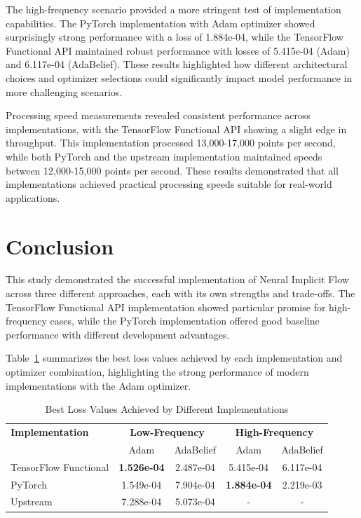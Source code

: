 \documentclass[10pt,journal,compsoc,onecolumn]{IEEEtran}
\begin{document}
The high-frequency scenario provided a more stringent test of implementation capabilities. The PyTorch implementation with Adam optimizer showed surprisingly strong performance with a loss of 1.884e-04, while the TensorFlow Functional API maintained robust performance with losses of 5.415e-04 (Adam) and 6.117e-04 (AdaBelief). These results highlighted how different architectural choices and optimizer selections could significantly impact model performance in more challenging scenarios.

Processing speed measurements revealed consistent performance across implementations, with the TensorFlow Functional API showing a slight edge in throughput. This implementation processed 13,000-17,000 points per second, while both PyTorch and the upstream implementation maintained speeds between 12,000-15,000 points per second. These results demonstrated that all implementations achieved practical processing speeds suitable for real-world applications.

\section{Conclusion}\label{sec:conclusion}
This study demonstrated the successful implementation of Neural Implicit Flow across three different approaches, each with its own strengths and trade-offs. The TensorFlow Functional API implementation showed particular promise for high-frequency cases, while the PyTorch implementation offered good baseline performance with different development advantages.

Table~\ref{tab:best_loss} summarizes the best loss values achieved by each implementation and optimizer combination, highlighting the strong performance of modern implementations with the Adam optimizer.

\begin{table}[htbp]
    \centering
    \caption{Best Loss Values Achieved by Different Implementations}
    \label{tab:best_loss}
    \begin{tabular}{lcccc}
        \hline
        \textbf{Implementation} & \multicolumn{2}{c}{\textbf{Low-Frequency}} & \multicolumn{2}{c}{\textbf{High-Frequency}} \\
        & Adam & AdaBelief & Adam & AdaBelief \\
        \hline
        TensorFlow Functional & \textbf{1.526e-04} & 2.487e-04 & 5.415e-04 & 6.117e-04 \\
        PyTorch & 1.549e-04 & 7.904e-04 & \textbf{1.884e-04} & 2.219e-03 \\
        Upstream & 7.288e-04 & 5.073e-04 & - & - \\
        \hline
    \end{tabular}
\end{table}
\end{document}
